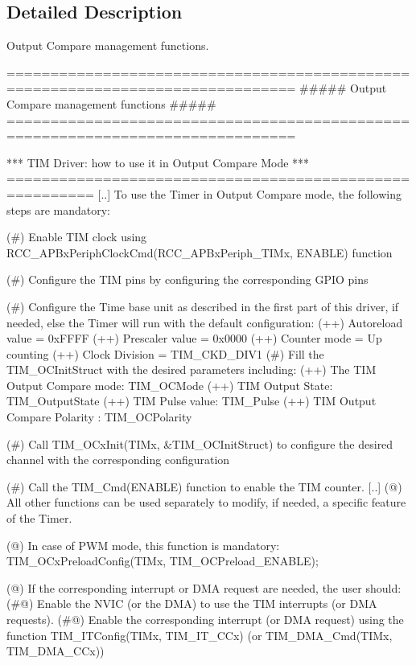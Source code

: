 \subsection{Detailed Description}
Output Compare management functions. \begin{DoxyVerb} ===============================================================================
                ##### Output Compare management functions #####
 ===============================================================================  
       
  *** TIM Driver: how to use it in Output Compare Mode ***
  ======================================================== 
  [..] 
  To use the Timer in Output Compare mode, the following steps are mandatory:
       
       (#) Enable TIM clock using RCC_APBxPeriphClockCmd(RCC_APBxPeriph_TIMx, ENABLE) function
       
       (#) Configure the TIM pins by configuring the corresponding GPIO pins
       
       (#) Configure the Time base unit as described in the first part of this driver, 
           if needed, else the Timer will run with the default configuration:
           (++) Autoreload value = 0xFFFF
           (++) Prescaler value = 0x0000
           (++) Counter mode = Up counting
           (++) Clock Division = TIM_CKD_DIV1   
       (#) Fill the TIM_OCInitStruct with the desired parameters including:
           (++) The TIM Output Compare mode: TIM_OCMode
           (++) TIM Output State: TIM_OutputState
           (++) TIM Pulse value: TIM_Pulse
           (++) TIM Output Compare Polarity : TIM_OCPolarity
       
       (#) Call TIM_OCxInit(TIMx, &TIM_OCInitStruct) to configure the desired channel with the 
           corresponding configuration
       
       (#) Call the TIM_Cmd(ENABLE) function to enable the TIM counter.
 [..]      
       (@) All other functions can be used separately to modify, if needed,
           a specific feature of the Timer. 
          
       (@) In case of PWM mode, this function is mandatory:
           TIM_OCxPreloadConfig(TIMx, TIM_OCPreload_ENABLE); 
              
       (@) If the corresponding interrupt or DMA request are needed, the user should:
                (#@) Enable the NVIC (or the DMA) to use the TIM interrupts (or DMA requests). 
                (#@) Enable the corresponding interrupt (or DMA request) using the function 
                     TIM_ITConfig(TIMx, TIM_IT_CCx) (or TIM_DMA_Cmd(TIMx, TIM_DMA_CCx))   \end{DoxyVerb}


